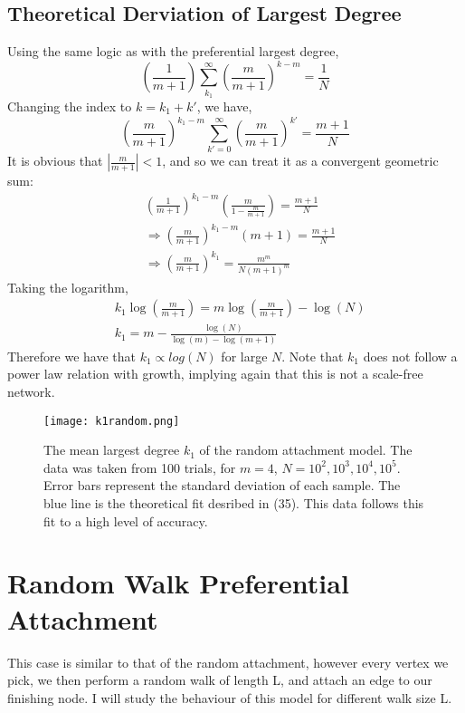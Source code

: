 \documentclass[]{article}
\begin{document}
\subsection{Theoretical Derviation of Largest Degree}
Using the same logic as with the preferential largest degree,
\begin{equation}
\left(\frac{1}{m+1}\right) \sum_{k_1}^{\infty} \left(\frac{m}{m+1}\right)^{k-m} = \frac{1}{N}
\end{equation}
Changing the index to $k=k_1 + k'$, we have,
\begin{equation}
	\left(\frac{m}{m+1}\right)^{k_1-m} \sum_{k'=0}^{\infty} \left(\frac{m}{m+1}\right)^{k'} = \frac{m+1}{N}
\end{equation}
It is obvious that $\left| \frac{m}{m+1} \right| < 1$, and so we can treat it as a convergent geometric sum:
\begin{equation}
\begin{align}
&\left(\frac{1}{m+1}\right)^{k_1-m} \left(\frac{m}{1-\frac{m}{m+1}}\right) = \frac{m+1}{N}\\
&\Rightarrow \left(\frac{m}{m+1}\right)^{k_1-m} (m+1)= \frac{m+1}{N}\\
&\Rightarrow \left(\frac{m}{m+1}\right)^{k_1}= \frac{m^m}{N(m+1)^m}
\end{align}
\end{equation}
Taking the logarithm,
\begin{equation}
\begin{align}
&k_1 \log\left(\frac{m}{m+1}\right)= m\log\left(\frac{m}{m+1}\right) -\log(N)\\
&k_1 = m -\frac{\log(N)}{\log(m)-\log(m+1)}
\end{align}
\end{equation}
Therefore we have that $k_1 \propto log(N)$ for large $N$. Note that $k_1$ does not follow a power law relation with growth, implying again that this is not a scale-free network. \\
\begin{figure}[htbp]
	\centering
	
	\texttt{[image: k1random.png]}
	\caption{The mean largest degree $k_1$ of the random attachment model. The data was taken from 100 trials, for $m=4$, $N=10^2, 10^3, 10^4, 10^5$. Error bars represent the standard deviation of each sample. The blue line is the theoretical fit desribed in (35). This data follows this fit to a high level of accuracy. }
\end{figure}
\section{Random Walk Preferential Attachment}
This case is similar to that of the random attachment, however every vertex we pick, we then perform a random walk of length L, and attach an edge to our finishing node. I will study the behaviour of this model for different walk size L. 
\end{document}
